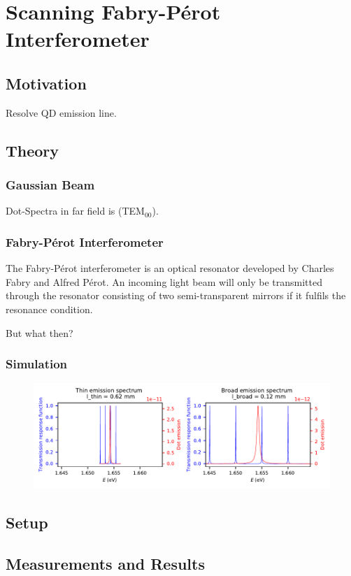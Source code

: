 \chapter{Scanning Fabry-Pérot Interferometer}

\section{Motivation}

Resolve QD emission line.

\section{Theory}

\subsection{Gaussian Beam}

Dot-Spectra in far field is (TEM$_{00}$).

\subsection{Fabry-Pérot Interferometer}

The Fabry-Pérot interferometer is an optical resonator developed by Charles Fabry and Alfred Pérot.
An incoming light beam will only be transmitted through the resonator consisting of two semi-transparent mirrors if it fulfils the resonance condition.\cite{kaldewey_coherent_2017}

But what then?

\subsection{Simulation}

\begin{figure}[H]
	\centering
	\includegraphics[width=\linewidth]{figures/plots/fabry-perot/simulation-comparison-dot-fabry-perot-modes}
	\caption{}
	\label{fig:simulation-comparison-dot-fabry-perot-modes}
\end{figure}


\Blindtext

\section{Setup}

\section{Measurements and Results}